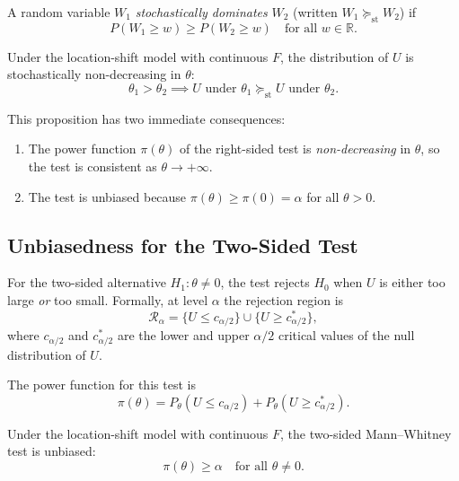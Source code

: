 \documentclass[10pt]{article}
\begin{document}
\begin{definition}
A random variable $W_1$ \emph{stochastically dominates} $W_2$
(written $W_1 \succeq_{\mathrm{st}} W_2$) if
\[
  P(W_1 \geq w) \geq P(W_2 \geq w)
  \quad \text{for all } w \in \mathbb{R}.
\]
\end{definition}

\begin{proposition}
\label{prop:stoch_dom}
Under the location-shift model with continuous $F$, the distribution
of $U$ is stochastically non-decreasing in $\theta$:
\[
  \theta_1 > \theta_2
  \implies
  U \text{ under } \theta_1
  \succeq_{\mathrm{st}}
  U \text{ under } \theta_2.
\]
\end{proposition}

This proposition has two immediate consequences:
\begin{enumerate}[label=(\roman*)]
  \item The power function $\pi(\theta)$ of the right-sided test
        is \emph{non-decreasing} in $\theta$, so the test is
        consistent as $\theta \to +\infty$.
  \item The test is unbiased because
        $\pi(\theta) \geq \pi(0) = \alpha$ for all $\theta > 0$.
\end{enumerate}

\subsection{Unbiasedness for the Two-Sided Test}

For the two-sided alternative $H_1 : \theta \neq 0$, the test
rejects $H_0$ when $U$ is either too large \emph{or} too small.
Formally, at level $\alpha$ the rejection region is
\[
  \mathcal{R}_\alpha
  = \{U \leq c_{\alpha/2}\} \cup \{U \geq c^*_{\alpha/2}\},
\]
where $c_{\alpha/2}$ and $c^*_{\alpha/2}$ are the lower and upper
$\alpha/2$ critical values of the null distribution of $U$.

The power function for this test is
\[
  \pi(\theta) = P_\theta(U \leq c_{\alpha/2})
              + P_\theta(U \geq c^*_{\alpha/2}).
\]

\begin{theorem}
\label{thm:two_sided_unbiasedness}
Under the location-shift model with continuous $F$, the two-sided
Mann--Whitney test is unbiased:
\[
  \pi(\theta) \geq \alpha
  \quad \text{for all } \theta \neq 0.
\]
\end{theorem}
\end{document}
